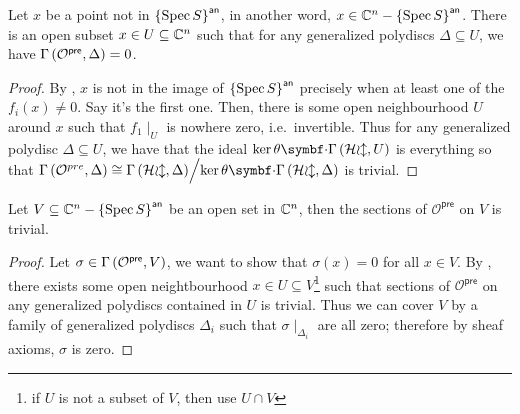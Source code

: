 \begin{lemma}\label{thm:trivial-preanalytification-sheaf-on-generalized-polydisc-outside}
  Let $x$ be a point not in ${\left\{{\operatorname{Spec}{S}}\right\}}^{\mathsf{an}}$, in another word, $x \in \mathbb{C}^{n} - {\left\{{\operatorname{Spec}{S}}\right\}}^{\mathsf{an}}$.
  There is an open subset $x \in U \subseteq \mathbb{C}^{n}$ such that for any generalized polydiscs $\Delta \subseteq U$, we have ${\Gamma\left(\mathcal{O}^{\mathsf{pre}},\Delta\right)} = 0$.
\end{lemma}
\begin{proof}
  By , $x$ is not in the image of ${\left\{{\operatorname{Spec}{S}}\right\}}^{\mathsf{an}}$ precisely when at least one of the $f_{i}(x) \ne 0$. Say it's the first one. Then, there is some open neighbourhood $U$ around $x$ such that $f_{1}\mid_{U}$ is nowhere zero, i.e.\ invertible. Thus for any generalized polydisc $\Delta \subseteq U$, we have that the ideal $\ker\theta\smul\sections{\mathcal{Hol}}U$ is everything so that $\sections{\mathcal{O}^{pre}}{\Delta}\cong\quotient{\sections{\mathcal{Hol}}{\Delta}}{\ker\theta\smul\sections{\mathcal{Hol}}{\Delta}}$ is trivial.
\end{proof}
\begin{corollary}\label{thm:trivial-preanalytification-sheaf-on-outside-open-set}
  Let $V \subseteq \mathbb{C}^{n}-{\left\{{\operatorname{Spec} S}\right\}}^{\mathsf{an}}$ be an open set in $\mathbb{C}^{n}$, then the sections of $\mathcal{O}^{\mathsf{pre}}$ on $V$ is trivial.
\end{corollary}
\begin{proof}
  Let $\sigma \in {\Gamma\left(\mathcal{O}^{\mathsf{pre}},V\right)}$, we want to show that $\sigma(x) = 0$ for all $x \in V$. By , there exists some open neightbourhood $x \in U \subseteq V$\footnote{if $U$ is not a subset of $V$, then use $U \cap V$} such that
  sections of $\mathcal{O}^{\mathsf{pre}}$ on any generalized polydiscs contained in $U$ is trivial. Thus we can cover $V$ by a family of generalized polydiscs $\Delta_{i}$ such that $\sigma\mid_{\Delta_{i}}$ are all zero; therefore by sheaf axioms, $\sigma$ is zero.
\end{proof}

